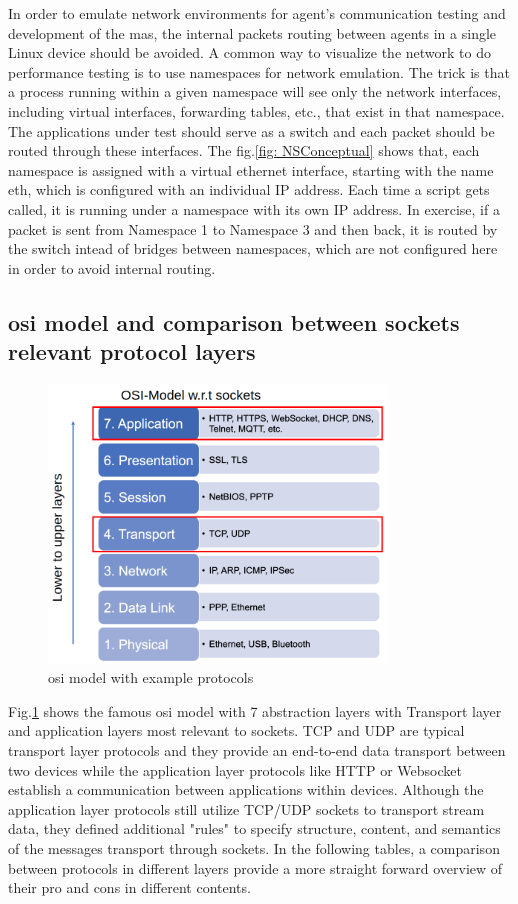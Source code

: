 In order to emulate network environments for agent's communication testing 
and development of the \gls{mas}, the internal packets routing between 
agents in a single Linux device should be avoided. A common way to 
visualize the network to do performance testing is to use namespaces 
for network emulation. The trick is that a process running within a given 
namespace will see only the network interfaces, including virtual 
interfaces, forwarding tables, etc., that exist in that namespace. 
The applications under test should serve as a switch and each packet 
should be routed through these interfaces. The fig.\ref{fig: NSConceptual} 
shows that, each namespace is assigned with a virtual ethernet interface, 
starting with the name eth, which is configured with an individual IP 
address. Each time a script gets called, it is running under a namespace 
with its own IP address. In exercise, if a packet is sent from Namespace 1 
to Namespace 3 and then back, it is routed by the switch intead of bridges 
between namespaces, which are not configured here in order to avoid 
internal routing.

\subsection{\gls{osi} model and comparison between sockets relevant protocol layers}
\begin{figure}[htbp]
\includegraphics[width=0.8\textwidth]{figures/OSI.png}
\centering
\caption{\gls{osi} model with example protocols \label{fig: OSI}}
\end{figure}

Fig.\ref{fig: OSI} shows the famous \gls{osi} model with 7 abstraction layers with Transport layer and application layers most relevant to sockets. 
TCP and UDP are typical transport layer protocols and they provide an end-to-end data transport between two devices while the application layer protocols like HTTP or Websocket establish a communication between applications within devices. 
Although the application layer protocols still utilize TCP/UDP sockets to transport stream data, they defined additional "rules" to specify structure, content, and semantics of the messages transport through sockets. 
In the following tables, a comparison between protocols in different layers provide a more straight forward overview of their pro and cons in different contents.


